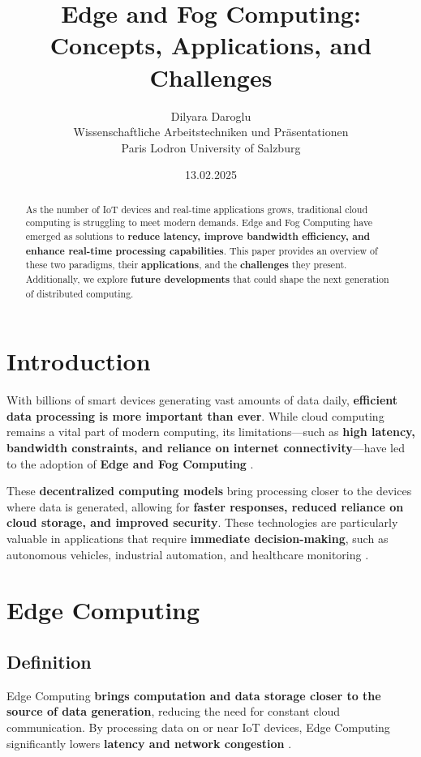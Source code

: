 \documentclass[a4paper,12pt]{article}
\title{Edge and Fog Computing: Concepts, Applications, and Challenges}
\author{Dilyara Daroglu \\ Wissenschaftliche Arbeitstechniken und Präsentationen \\ Paris Lodron University of Salzburg }
\date{13.02.2025}
\begin{document}
	
	\maketitle
	
	\begin{abstract}
		As the number of IoT devices and real-time applications grows, traditional cloud computing is struggling to meet modern demands. Edge and Fog Computing have emerged as solutions to \textbf{reduce latency, improve bandwidth efficiency, and enhance real-time processing capabilities}. This paper provides an overview of these two paradigms, their \textbf{applications}, and the \textbf{challenges} they present. Additionally, we explore \textbf{future developments} that could shape the next generation of distributed computing.
	\end{abstract}
	
	\section{Introduction}
	With billions of smart devices generating vast amounts of data daily, \textbf{efficient data processing is more important than ever}. While cloud computing remains a vital part of modern computing, its limitations—such as \textbf{high latency, bandwidth constraints, and reliance on internet connectivity}—have led to the adoption of \textbf{Edge and Fog Computing} \cite{weber2021edge}. 
	
	These \textbf{decentralized computing models} bring processing closer to the devices where data is generated, allowing for \textbf{faster responses, reduced reliance on cloud storage, and improved security}. These technologies are particularly valuable in applications that require \textbf{immediate decision-making}, such as autonomous vehicles, industrial automation, and healthcare monitoring \cite{ibm2022edge}.
	
	\section{Edge Computing}
	\subsection{Definition}
	Edge Computing \textbf{brings computation and data storage closer to the source of data generation}, reducing the need for constant cloud communication. By processing data on or near IoT devices, Edge Computing significantly lowers \textbf{latency and network congestion} \cite{shi2016edge}.
	
\end{document}
